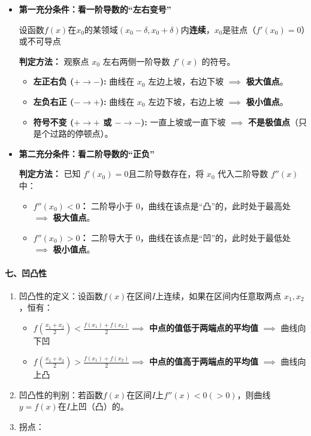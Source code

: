 \documentclass[
]{article}
\begin{document}
\begin{itemize}
\item
  \textbf{第一充分条件：看一阶导数的``左右变号''}

  设函数\(f(x)\)在\(x_0\)的某领域\((x_0-\delta,x_0+\delta)\)内\textbf{连续}，\(x_0\)是驻点（\(f'(x_0) = 0\)）或不可导点

  \textbf{判定方法：} 观察点 \(x_0\) 左右两侧一阶导数 \(f'(x)\) 的符号。

  \begin{itemize}
  \item
    \textbf{左正右负 (\(+ \to -\)):} 曲线在 \(x_0\) 左边上坡，右边下坡
    \(\implies\) \textbf{极大值点}。
  \item
    \textbf{左负右正 (\(- \to +\)):} 曲线在 \(x_0\) 左边下坡，右边上坡
    \(\implies\) \textbf{极小值点}。
  \item
    \textbf{符号不变 (\(+ \to +\) 或 \(- \to -\)):} 一直上坡或一直下坡
    \(\implies\) \textbf{不是极值点}（只是个过路的停顿点）。
  \end{itemize}
\item
  \textbf{第二充分条件：看二阶导数的``正负''}

  \textbf{判定方法：} 已知 \(f'(x_0) = 0\)且二阶导数存在，将 \(x_0\)
  代入二阶导数 \(f''(x)\) 中：

  \begin{itemize}
  \item
    \textbf{\(f''(x_0) < 0\)：} 二阶导小于
    0，曲线在该点是``凸''的，此时处于最高处 \(\implies\)
    \textbf{极大值点}。
  \item
    \textbf{\(f''(x_0) > 0\)：} 二阶导大于
    0，曲线在该点是``凹''的，此时处于最低处 \(\implies\)
    \textbf{极小值点}。
  \end{itemize}
\end{itemize}

\paragraph{七、凹凸性}\label{ux4e03ux51f9ux51f8ux6027}

\begin{enumerate}
\def\labelenumi{\arabic{enumi}.}
\item
  凹凸性的定义：设函数\(f(x)\)在区间\(I\)上连续，如果在区间内任意取两点
  \(x_1, x_2\)，恒有：

  \begin{itemize}
  \item
    \(f\left(\frac{x_1+x_2}{2}\right) < \frac{f(x_1)+f(x_2)}{2} \implies\)
    \textbf{中点的值低于两端点的平均值} \(\implies\) 曲线向下凹
  \item
    \(f\left(\frac{x_1+x_2}{2}\right) > \frac{f(x_1)+f(x_2)}{2} \implies\)
    \textbf{中点的值高于两端点的平均值} \(\implies\) 曲线向上凸
  \end{itemize}
\item
  凹凸性的判别：若函数\(f(x)\)在区间\(I\)上\(f''(x)<0(>0)\)，则曲线\(y=f(x)\)在\(I\)上凹（凸）的。
\item
  拐点：
\end{enumerate}
\end{document}
